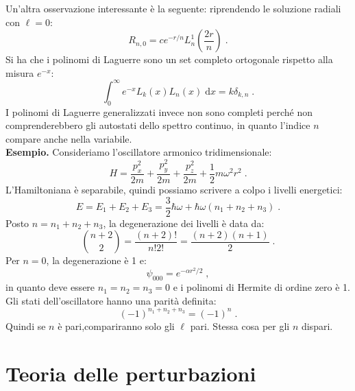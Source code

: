 \documentclass[12pt,a4paper]{report}
\theoremstyle{definition}
\numberwithin{equation}{section}
\newcommand{\diff}[1][]{\mathrm{d}#1}
\begin{document}
Un'altra osservazione interessante è la seguente: riprendendo le soluzione radiali con $\ell=0$:
\begin{equation}
R_{n,0}=ce^{-r/n}L^1_n\left(\frac{2r}{n}\right)\;.
\end{equation}
Si ha che i polinomi di Laguerre sono un set completo ortogonale rispetto alla misura $e^{-x}$:
\begin{equation}
\int_0^{\infty}e^{-x}L_k(x)L_n(x)\;\diff{x}=k\delta_{k,n}\;.
\end{equation}
I polinomi di Laguerre generalizzati invece non sono completi perché non comprenderebbero gli autostati dello spettro continuo, in quanto l'indice $n$ compare anche nella variabile. \\
\textbf{Esempio.} Consideriamo l'oscillatore armonico tridimensionale:
\begin{equation}
H=\frac{p_x^2}{2m}+\frac{p_y^2}{2m}+\frac{p_z^2}{2m}+\frac{1}{2}m\omega^2r^2\;.
\end{equation}
L'Hamiltoniana è separabile, quindi possiamo scrivere a colpo i livelli energetici:
\begin{equation}
E=E_1+E_2+E_3=\frac{3}{2}\hbar\omega +\hbar\omega(n_1+n_2+n_3)\;.
\end{equation}
Posto $n=n_1+n_2+n_3$, la degenerazione dei livelli è data da:
\begin{equation}
\binom{n+2}{2}=\frac{(n+2)!}{n! 2!}=\frac{(n+2)(n+1)}{2}\;.
\end{equation}
Per $n=0$, la degenerazione è 1 e:
\begin{equation}
\psi_{000}=e^{-\alpha r^2/2}\;,
\end{equation}
in quanto deve essere $n_1=n_2=n_3=0$ e i polinomi di Hermite di ordine zero è 1. Gli stati dell'oscillatore hanno una parità definita:
\begin{equation}
(-1)^{n_1+n_2+n_3}=(-1)^n\;.
\end{equation}
Quindi se $n$ è pari,compariranno solo gli $\ell$ pari. Stessa cosa per gli $n$ dispari.
\chapter{Teoria delle perturbazioni}
\end{document}
